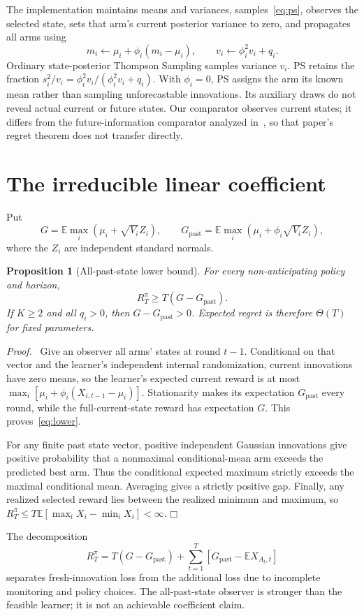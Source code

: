 \documentclass[11pt]{article}
\newtheorem{proposition}{Proposition}
\newenvironment{proof}{\par\noindent\textit{Proof.}\ }{\hfill$\mdlgwhtsquare$\par\medskip}
\newcommand{\E}{\mathbb E}
\begin{document}
The implementation maintains means and variances, samples~\eqref{eq:ps}, observes the selected state, sets that arm's current posterior variance to zero, and propagates all arms using
\[
m_i\leftarrow\mu_i+\phi_i(m_i-\mu_i),\qquad
v_i\leftarrow\phi_i^2v_i+q_i.
\]
Ordinary state-posterior Thompson Sampling samples variance $v_i$. PS retains the fraction $s_i^2/v_i=\phi_i^2v_i/(\phi_i^2v_i+q_i)$. With $\phi_i=0$, PS assigns the arm its known mean rather than sampling unforecastable innovations. Its auxiliary draws do not reveal actual current or future states. Our comparator observes current states; it differs from the future-information comparator analyzed in~\cite{liu2023}, so that paper's regret theorem does not transfer directly.

\section{The irreducible linear coefficient}
Put
\begin{equation}
G=\E\max_i(\mu_i+\sqrt{V_i}Z_i),\qquad
G_{\mathrm{past}}=\E\max_i(\mu_i+\phi_i\sqrt{V_i}Z_i),
\end{equation}
where the $Z_i$ are independent standard normals.

\begin{proposition}[All-past-state lower bound]
For every non-anticipating policy and horizon,
\begin{equation}
R_T^\pi\geq T(G-G_{\mathrm{past}}).
\label{eq:lower}
\end{equation}
If $K\geq2$ and all $q_i>0$, then $G-G_{\mathrm{past}}>0$. Expected regret is therefore $\Theta(T)$ for fixed parameters.
\end{proposition}
\begin{proof}
Give an observer all arms' states at round $t-1$. Conditional on that vector and the learner's independent internal randomization, current innovations have zero means, so the learner's expected current reward is at most $\max_i[\mu_i+\phi_i(X_{i,t-1}-\mu_i)]$. Stationarity makes its expectation $G_{\mathrm{past}}$ every round, while the full-current-state reward has expectation $G$. This proves~\eqref{eq:lower}.

For any finite past state vector, positive independent Gaussian innovations give positive probability that a nonmaximal conditional-mean arm exceeds the predicted best arm. Thus the conditional expected maximum strictly exceeds the maximal conditional mean. Averaging gives a strictly positive gap. Finally, any realized selected reward lies between the realized minimum and maximum, so
$R_T^\pi\leq T\E[\max_iX_i-\min_iX_i]<\infty$.
\end{proof}
The decomposition
\begin{equation}
R_T^\pi=T(G-G_{\mathrm{past}})+
\sum_{t=1}^T[G_{\mathrm{past}}-\E X_{A_t,t}]
\end{equation}
separates fresh-innovation loss from the additional loss due to incomplete monitoring and policy choices. The all-past-state observer is stronger than the feasible learner; it is not an achievable coefficient claim.
\end{document}
